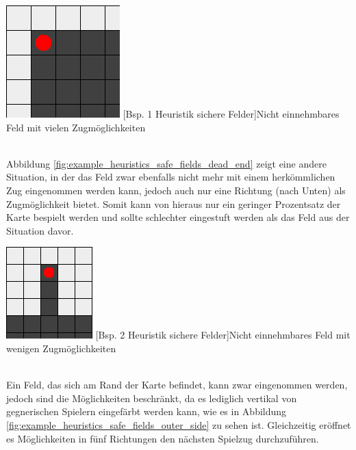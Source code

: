 \documentclass[12pt,a4paper,bibliography=totocnumbered,listof=totocnumbered]{article}
\begin{document}
\vspace{1em}
\begin{minipage}{\linewidth}
	\centering
	\includegraphics[width=0.3\linewidth]{pics/heuristics_safe_fields_corner.png}
	[Bsp. 1 Heuristik sichere Felder]{Nicht einnehmbares Feld mit vielen 		Zugmöglichkeiten}
	\label{fig:example_heuristics_safe_fields_corner}
\end{minipage}
\\

Abbildung \ref{fig:example_heuristics_safe_fields_dead_end} zeigt eine andere Situation, in der das Feld zwar ebenfalls nicht mehr mit einem herkömmlichen Zug eingenommen werden kann, jedoch auch nur eine Richtung (nach Unten) als Zugmöglichkeit bietet. Somit kann von hieraus nur ein geringer Prozentsatz der Karte bespielt werden und sollte schlechter eingestuft werden als das Feld aus der Situation davor.

\vspace{1em}
\begin{minipage}{\linewidth}
	\centering
	\includegraphics[width=0.3\linewidth]{pics/heuristics_safe_fields_dead_end.png}
	[Bsp. 2 Heuristik sichere Felder]{Nicht einnehmbares Feld mit wenigen Zugmöglichkeiten}
	\label{fig:example_heuristics_safe_fields_dead_end}
\end{minipage}
\\

Ein Feld, das sich am Rand der Karte befindet, kann zwar eingenommen werden, jedoch sind die Möglichkeiten beschränkt, da es lediglich vertikal von gegnerischen Spielern eingefärbt werden kann, wie es in Abbildung \ref{fig:example_heuristics_safe_fields_outer_side} zu sehen ist. Gleichzeitig eröffnet es Möglichkeiten in fünf Richtungen den nächsten Spielzug durchzuführen.
\end{document}
